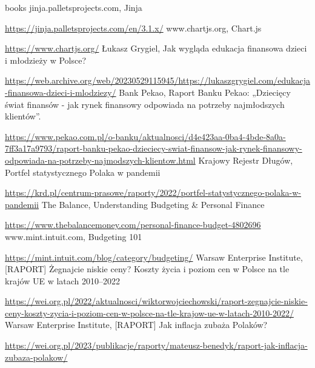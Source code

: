 \documentclass[a4paper,10pt, twoside]{report}
\begin{document}
\begin{thebibliography} {books}
     jinja.palletsprojects.com, Jinja \raggedright\url{
        https://jinja.palletsprojects.com/en/3.1.x/}
     www.chartjs.org, Chart.js \raggedright\url{
        https://www.chartjs.org/}
     Łukasz Grygiel, Jak wygląda edukacja finansowa dzieci i młodzieży w Polsce? \raggedright\url{
        https://web.archive.org/web/20230529115945/https://lukaszgrygiel.com/edukacja-finansowa-dzieci-i-mlodziezy/}
     Bank Pekao, Raport Banku Pekao: „Dziecięcy świat finansów - jak rynek finansowy odpowiada na potrzeby najmłodszych klientów”. \raggedright\url{
        https://www.pekao.com.pl/o-banku/aktualnosci/d4e423aa-0ba4-4bde-8a0a-7ff3a17a9793/raport-banku-pekao-dzieciecy-swiat-finansow-jak-rynek-finansowy-odpowiada-na-potrzeby-najmodszych-klientow.html}
     Krajowy Rejestr Długów, Portfel statystycznego Polaka w pandemii \raggedright\url{
        https://krd.pl/centrum-prasowe/raporty/2022/portfel-statystycznego-polaka-w-pandemii}
     The Balance, Understanding Budgeting \& Personal Finance\raggedright\url{
        https://www.thebalancemoney.com/personal-finance-budget-4802696}
     www.mint.intuit.com, Budgeting 101 \raggedright\url{
        https://mint.intuit.com/blog/category/budgeting/}
     Warsaw Enterprise Institute, [RAPORT] Żegnajcie niskie ceny? Koszty życia i poziom cen w Polsce na tle krajów UE w latach 2010–2022 \raggedright\url{
        https://wei.org.pl/2022/aktualnosci/wiktorwojciechowski/raport-zegnajcie-niskie-ceny-koszty-zycia-i-poziom-cen-w-polsce-na-tle-krajow-ue-w-latach-2010-2022/}
     Warsaw Enterprise Institute, [RAPORT] Jak inflacja zubaża Polaków? \raggedright\url{
        https://wei.org.pl/2023/publikacje/raporty/mateusz-benedyk/raport-jak-inflacja-zubaza-polakow/}
\end{thebibliography}

\listoffigures
\listoftables
\lstlistoflistings
\end{document}
